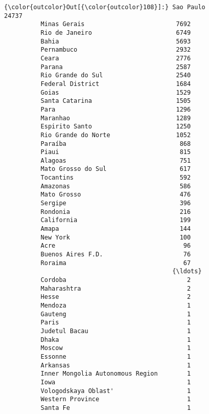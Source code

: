 \documentclass[11pt]{article}
\begin{document}
\begin{Verbatim}[commandchars=\\\{\}]
{\color{outcolor}Out[{\color{outcolor}108}]:} Sao Paulo                           24737
          Minas Gerais                         7692
          Rio de Janeiro                       6749
          Bahia                                5693
          Pernambuco                           2932
          Ceara                                2776
          Parana                               2587
          Rio Grande do Sul                    2540
          Federal District                     1684
          Goias                                1529
          Santa Catarina                       1505
          Para                                 1296
          Maranhao                             1289
          Espirito Santo                       1250
          Rio Grande do Norte                  1052
          Paraíba                               868
          Piaui                                 815
          Alagoas                               751
          Mato Grosso do Sul                    617
          Tocantins                             592
          Amazonas                              586
          Mato Grosso                           476
          Sergipe                               396
          Rondonia                              216
          California                            199
          Amapa                                 144
          New York                              100
          Acre                                   96
          Buenos Aires F.D.                      76
          Roraima                                67
                                              {\ldots}  
          Cordoba                                 2
          Maharashtra                             2
          Hesse                                   2
          Mendoza                                 1
          Gauteng                                 1
          Paris                                   1
          Judetul Bacau                           1
          Dhaka                                   1
          Moscow                                  1
          Essonne                                 1
          Arkansas                                1
          Inner Mongolia Autonomous Region        1
          Iowa                                    1
          Vologodskaya Oblast'                    1
          Western Province                        1
          Santa Fe                                1

\end{Verbatim}
\end{document}
